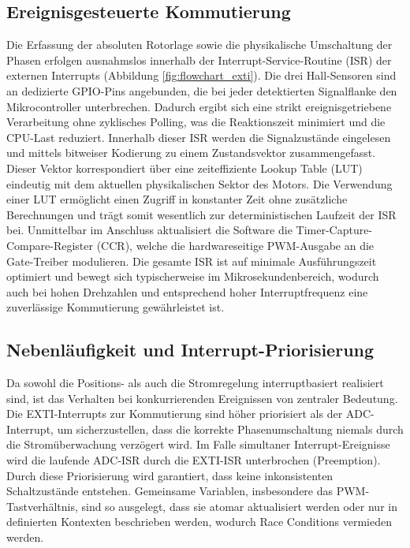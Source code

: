 \subsection{Ereignisgesteuerte Kommutierung}
Die Erfassung der absoluten Rotorlage sowie die physikalische Umschaltung der Phasen erfolgen ausnahmslos innerhalb der Interrupt-Service-Routine (ISR) der externen Interrupts (Abbildung \ref{fig:flowchart_exti}). Die drei Hall-Sensoren sind an dedizierte GPIO-Pins angebunden, die bei jeder detektierten Signalflanke den Mikrocontroller unterbrechen. Dadurch ergibt sich eine strikt ereignisgetriebene Verarbeitung ohne zyklisches Polling, was die Reaktionszeit minimiert und die CPU-Last reduziert.
Innerhalb dieser ISR werden die Signalzustände eingelesen und mittels bitweiser Kodierung zu einem Zustandsvektor zusammengefasst. Dieser Vektor korrespondiert über eine zeiteffiziente Lookup Table (LUT) eindeutig mit dem aktuellen physikalischen Sektor des Motors. Die Verwendung einer LUT ermöglicht einen Zugriff in konstanter Zeit ohne zusätzliche Berechnungen und trägt somit wesentlich zur deterministischen Laufzeit der ISR bei.
Unmittelbar im Anschluss aktualisiert die Software die Timer-Capture-Compare-Register (CCR), welche die hardwareseitige PWM-Ausgabe an die Gate-Treiber modulieren. Die gesamte ISR ist auf minimale Ausführungszeit optimiert und bewegt sich typischerweise im Mikrosekundenbereich, wodurch auch bei hohen Drehzahlen und entsprechend hoher Interruptfrequenz eine zuverlässige Kommutierung gewährleistet ist.

\subsection{Nebenläufigkeit und Interrupt-Priorisierung}
Da sowohl die Positions- als auch die Stromregelung interruptbasiert realisiert sind, ist das Verhalten bei konkurrierenden Ereignissen von zentraler Bedeutung. Die EXTI-Interrupts zur Kommutierung sind höher priorisiert als der ADC-Interrupt, um sicherzustellen, dass die korrekte Phasenumschaltung niemals durch die Stromüberwachung verzögert wird.
Im Falle simultaner Interrupt-Ereignisse wird die laufende ADC-ISR durch die EXTI-ISR unterbrochen (Preemption). Durch diese Priorisierung wird garantiert, dass keine inkonsistenten Schaltzustände entstehen. Gemeinsame Variablen, insbesondere das PWM-Tastverhältnis, sind so ausgelegt, dass sie atomar aktualisiert werden oder nur in definierten Kontexten beschrieben werden, wodurch Race Conditions vermieden werden.


